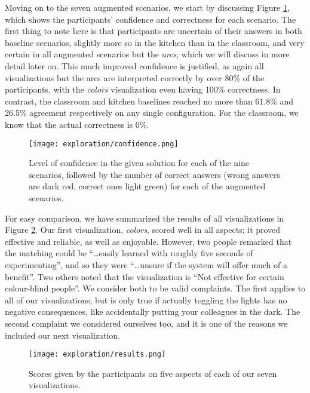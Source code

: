 \clearpage

Moving on to the seven augmented scenarios, we start by discussing Figure \ref{fig:explor:confidence}, which shows the participants' confidence and correctness for each scenario. The first thing to note here is that participants are uncertain of their answers in both baseline scenarios, slightly more so in the kitchen than in the classroom, and very certain in all augmented scenarios but the \textit{arcs}, which we will discuss in more detail later on. This much improved confidence is justified, as again all visualizations but the arcs are interpreted correctly by over 80\% of the participants, with the \textit{colors} visualization even having 100\% correctness. In contrast, the classroom and kitchen baselines reached no more than 61.8\% and 26.5\% agreement respectively on any single configuration. For the classroom, we know that the actual correctness is 0\%.

\begin{figure}
    \centering
    \texttt{[image: exploration/confidence.png]}
    \caption{Level of confidence in the given solution for each of the nine scenarios, followed by the number of correct answers (wrong answers are dark red, correct ones light green) for each of the augmented scenarios.}
    \label{fig:explor:confidence}
\end{figure}

For easy comparison, we have summarized the results of all visualizations in Figure \ref{fig:explor:results}. Our first visualization, \textit{colors}, scored well in all aspects; it proved effective and reliable, as well as enjoyable. However, two people remarked that the matching could be ``\ldots easily learned with roughly five seconds of experimenting'', and so they were ``\ldots unsure if the system will offer much of a benefit''. Two others noted that the visualization is ``Not effective for certain colour-blind people''. We consider both to be valid complaints. The first applies to all of our visualizations, but is only true if actually toggling the lights has no negative consequences, like accidentally putting your colleagues in the dark. The second complaint we considered ourselves too, and it is one of the reasons we included our next visualization.



\begin{figure}
    \centering
    \texttt{[image: exploration/results.png]}
    \caption{Scores given by the participants on five aspects of each of our seven visualizations.}
    \label{fig:explor:results}
\end{figure}

